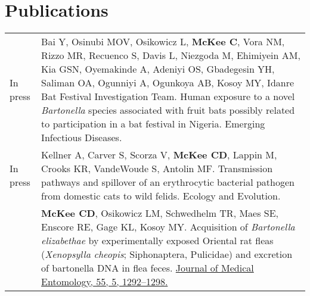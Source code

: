\documentclass[letterpaper]{deedy-resume} %
\begin{document}
\section{Publications}
\begin{tabular}{>{\raggedright\arraybackslash}p{2cm}p{16cm}}

In press & Bai Y, Osinubi MOV, Osikowicz L, \textbf{McKee C}, Vora NM, Rizzo MR, Recuenco S, Davis L, Niezgoda M, Ehimiyein AM, Kia GSN, Oyemakinde A, Adeniyi OS, Gbadegesin YH, Saliman OA, Ogunniyi A, Ogunkoya AB, Kosoy MY, Idanre Bat Festival Investigation Team. Human exposure to a novel \textit{Bartonella} species associated  with fruit bats possibly related to participation in a bat festival in Nigeria. \textcolor{special}{Emerging Infectious Diseases}.\\

In press & Kellner A, Carver S, Scorza V, \textbf{McKee CD}, Lappin M, Crooks KR, VandeWoude S, Antolin MF. Transmission pathways and spillover of an erythrocytic bacterial pathogen from domestic cats to wild felids. \textcolor{special}{Ecology and Evolution}.\\

2018 & \textbf{McKee CD}, Osikowicz LM, Schwedhelm TR, Maes SE, Enscore RE, Gage KL, Kosoy MY. Acquisition of \textit{Bartonella elizabethae} by experimentally exposed Oriental rat fleas (\textit{Xenopsylla cheopis}; Siphonaptera, Pulicidae) and excretion of bartonella DNA in flea feces. \href{https://doi.org/10.1093/jme/tjy085}{\textcolor{special}{Journal of Medical Entomology, 55, 5, 1292–1298}.}\\

\end{tabular}
\end{document}
